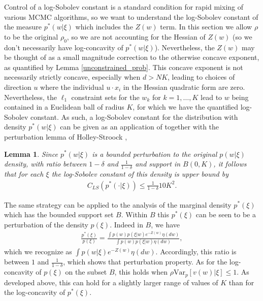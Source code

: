 \documentclass{article}
\numberwithin{equation}{section}
\theoremstyle{Lemma}
\newtheorem{lemma}{Lemma}
\theoremstyle{Corollary}
\theoremstyle{Theorem}
\theoremstyle{Remark}
\begin{document}
Control of a log-Sobolev constant is a standard condition for rapid mixing of various MCMC algorithms, so we want to understand the log-Sobolev constant of the measure $p^{*}(w|\xi)$ which includes the $Z(w)$ term. In this section we allow $\rho$ to be the original $\rho_0$, so we are not accounting for the Hessian of $Z(w)$ (so we don't necessarily have log-concavity of $p^*(w|\xi)$). Nevertheless, the $Z(w)$ may be thought of as a small magnitude correction to the otherwise concave exponent, as quantified by Lemma \ref{unconstrained_prob}.  This concave exponent is not necessarily strictly concave, especially when $d> NK$, leading to choices of direction $u$ where the individual $u\cdot x_i$ in the Hessian quadratic form are zero. Nevertheless, the $\ell_1$ constraint sets for the $w_k$ for $k=1,\ldots, K$ lead to $w$ being contained in a Euclidean ball of radius $K$, for which we have the quantified log-Sobolev constant.
As such, a log-Sobolev constant for the distribution with density $p^{*}(w|\xi)$ can be given as an application of \cite{bobkov1999isoperimetric} together with the perturbation lemma of Holley-Stroock \cite[Thm 1.1]{cattiaux2022functional},\cite{holley1987logarithmic}

\begin{lemma}
Since $p^{*}(w|\xi)$ is a bounded perturbation to the original $p(w|\xi)$ density, with ratio between $1-\delta$ and $\tfrac{1}{1-\delta}$ and support in $B(0,K)$, it follows that for each $\xi$ the log-Sobolev constant of this density is upper bound by
\begin{align}
C_{LS}(p^{*}(\cdot |\xi)) \leq \frac{1}{1- \delta} 10 K^{2}.
\end{align}
\end{lemma}

The same strategy can be applied to the analysis of the marginal density $p^*(\xi)$ which has the bounded support set $B$.  Within $B$ this $p^*(\xi)$ can be seen to be a perturbation of the density $p(\xi)$. Indeed in $B$, we have 
\begin{align}
\frac{p^*(\xi)}{p(\xi)}=\frac{ \int p(w) p(\xi|w)e^{-Z(w)}\eta(dw)}{\int p(w) p(\xi|w)\eta(dw)},
\end{align}
which we recognize as $\int p(w|\xi) e^{-Z(w)}\eta(dw)$. Accordingly, this ratio is between $1$ and $\tfrac{1}{1-\delta}$, which shows that perturbation property. As for the log-concavity of $p(\xi)$ on the subset $B$, this holds when $\rho \text{Var}_p [v(w)|\xi] \le 1$. As developed above, this can hold for a slightly larger range of values of $K$ than for the log-concavity of $p^*(\xi)$. 
\end{document}
